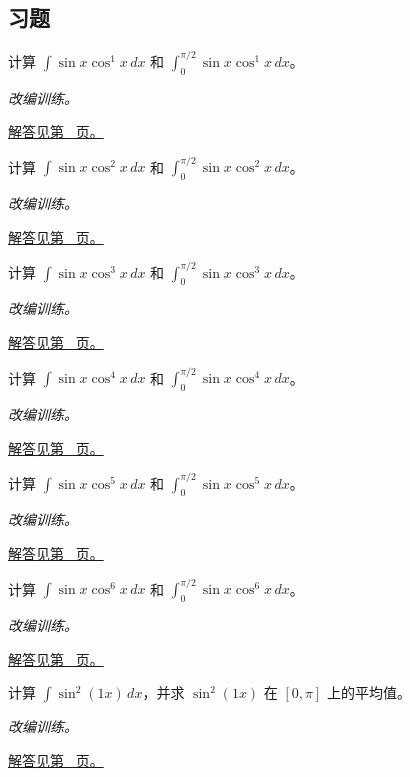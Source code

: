 \documentclass[UTF8,12pt,a4paper,fontset=fandol]{ctexart}
\begin{document}
\subsection{习题}
\begin{example}[正弦的一次因子]\label{ex:c14q1}
计算 $\displaystyle\int\sin x\cos^{1}x\,dx$ 和 $\displaystyle\int_0^{\pi/2}\sin x\cos^{1}x\,dx$。
\par\textit{改编训练。}\par\hyperref[ans:c14q1]{解答见第~\pageref{ans:c14q1} 页。}
\end{example}
\begin{example}[正弦的一次因子]\label{ex:c14q2}
计算 $\displaystyle\int\sin x\cos^{2}x\,dx$ 和 $\displaystyle\int_0^{\pi/2}\sin x\cos^{2}x\,dx$。
\par\textit{改编训练。}\par\hyperref[ans:c14q2]{解答见第~\pageref{ans:c14q2} 页。}
\end{example}
\begin{example}[正弦的一次因子]\label{ex:c14q3}
计算 $\displaystyle\int\sin x\cos^{3}x\,dx$ 和 $\displaystyle\int_0^{\pi/2}\sin x\cos^{3}x\,dx$。
\par\textit{改编训练。}\par\hyperref[ans:c14q3]{解答见第~\pageref{ans:c14q3} 页。}
\end{example}
\begin{example}[正弦的一次因子]\label{ex:c14q4}
计算 $\displaystyle\int\sin x\cos^{4}x\,dx$ 和 $\displaystyle\int_0^{\pi/2}\sin x\cos^{4}x\,dx$。
\par\textit{改编训练。}\par\hyperref[ans:c14q4]{解答见第~\pageref{ans:c14q4} 页。}
\end{example}
\begin{example}[正弦的一次因子]\label{ex:c14q5}
计算 $\displaystyle\int\sin x\cos^{5}x\,dx$ 和 $\displaystyle\int_0^{\pi/2}\sin x\cos^{5}x\,dx$。
\par\textit{改编训练。}\par\hyperref[ans:c14q5]{解答见第~\pageref{ans:c14q5} 页。}
\end{example}
\begin{example}[正弦的一次因子]\label{ex:c14q6}
计算 $\displaystyle\int\sin x\cos^{6}x\,dx$ 和 $\displaystyle\int_0^{\pi/2}\sin x\cos^{6}x\,dx$。
\par\textit{改编训练。}\par\hyperref[ans:c14q6]{解答见第~\pageref{ans:c14q6} 页。}
\end{example}
\begin{example}[降幂公式与平均值]\label{ex:c14q7}
计算 $\displaystyle\int\sin^2(1x)\,dx$，并求 $\sin^2(1x)$ 在 $[0,\pi]$ 上的平均值。
\par\textit{改编训练。}\par\hyperref[ans:c14q7]{解答见第~\pageref{ans:c14q7} 页。}
\end{example}
\end{document}
